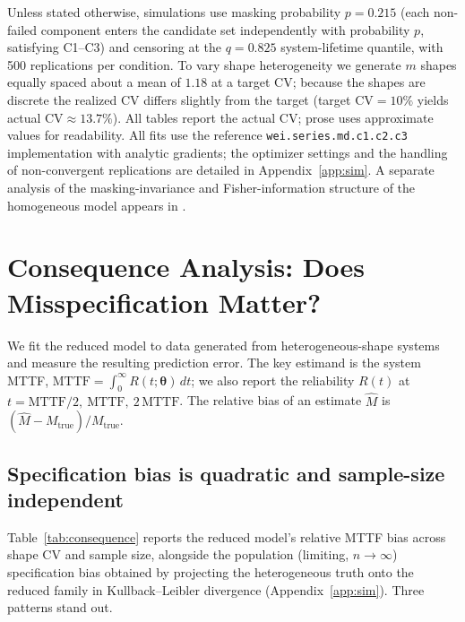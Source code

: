 \documentclass[11pt]{article}
\renewcommand{\v}[1]{\boldsymbol{#1}}
\newcommand{\CV}{\mathrm{CV}}
\newcommand{\MTTF}{\mathrm{MTTF}}
\begin{document}
Unless stated otherwise, simulations use masking probability $p = 0.215$ (each non-failed component enters the candidate set independently with probability $p$, satisfying C1--C3) and censoring at the $q = 0.825$ system-lifetime quantile, with 500 replications per condition. To vary shape heterogeneity we generate $m$ shapes equally spaced about a mean of $1.18$ at a target $\CV$; because the shapes are discrete the realized $\CV$ differs slightly from the target (target $\CV = 10\%$ yields actual $\CV \approx 13.7\%$). All tables report the actual $\CV$; prose uses approximate values for readability. All fits use the reference \texttt{wei.series.md.c1.c2.c3} implementation \citep{towell2023weibull} with analytic gradients; the optimizer settings and the handling of non-convergent replications are detailed in Appendix~\ref{app:sim}. A separate analysis of the masking-invariance and Fisher-information structure of the homogeneous model appears in \citet{towell2025weibull-fim}.

\section{Consequence Analysis: Does Misspecification Matter?}
\label{sec:consequences}

We fit the reduced model to data generated from heterogeneous-shape systems and measure the resulting prediction error. The key estimand is the system MTTF, $\MTTF = \int_0^\infty R(t;\v\theta)\,dt$; we also report the reliability $R(t)$ at $t = \MTTF/2,\ \MTTF,\ 2\,\MTTF$. The relative bias of an estimate $\hat M$ is $(\hat M - M_{\text{true}})/M_{\text{true}}$.

\subsection{Specification bias is quadratic and sample-size independent}

Table~\ref{tab:consequence} reports the reduced model's relative MTTF bias across shape $\CV$ and sample size, alongside the population (limiting, $n\to\infty$) specification bias obtained by projecting the heterogeneous truth onto the reduced family in Kullback--Leibler divergence (Appendix~\ref{app:sim}). Three patterns stand out.
\end{document}
